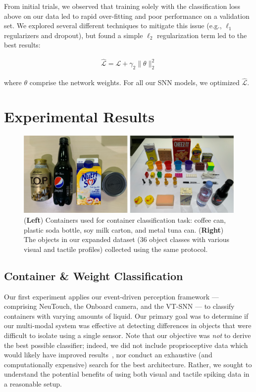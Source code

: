 \documentclass[fyp]{socreport}
\begin{document}
From initial trials, we observed that training solely with the classification
loss above on our data led to rapid over-fitting and poor performance on a
validation set. We explored several different techniques to mitigate this issue
(e.g., $\ell_1$ regularizers and dropout), but found a simple $\ell_2$
regularization term led to the best results:

\begin{align}
    \mathcal{\hat{L}} = \mathcal{L} +  \gamma_2 \| \theta \|^2_2
\end{align}

where $\theta$ comprise the network weights. For all our SNN models, we
optimized $\mathcal{\hat{L}}$.

\chapter{Experimental Results\label{cha:exp_results}}

\begin{figure}
\centering
\includegraphics[width=0.87\columnwidth]{images/robotsetup/objects_exp1_small.png}
\caption{(\textbf{Left}) Containers used for container classification task:
  coffee can, plastic soda bottle, soy milk carton, and metal tuna can.
  (\textbf{Right}) The objects in our expanded dataset ($36$ object classes with
  various visual and tactile profiles) collected using the same protocol.}
\label{fig:expobjects}
\end{figure}

\section{Container \& Weight Classification\label{sec:container_class}}

Our first experiment applies our event-driven perception framework ---
comprising NeuTouch, the Onboard camera, and the VT-SNN --- to classify
containers with varying amounts of liquid. Our primary goal was to determine if
our multi-modal system was effective at detecting differences in objects that
were difficult to isolate using a single sensor. Note that our objective was
\emph{not} to derive the {best possible classifier}; indeed, we did not include
proprioceptive data which would likely have improved
results~\cite{lee2019making}, nor conduct an exhaustive (and computationally
expensive) search for the best architecture. Rather, we sought to understand the
potential benefits of using both visual and tactile spiking data in a reasonable
setup.
\end{document}
